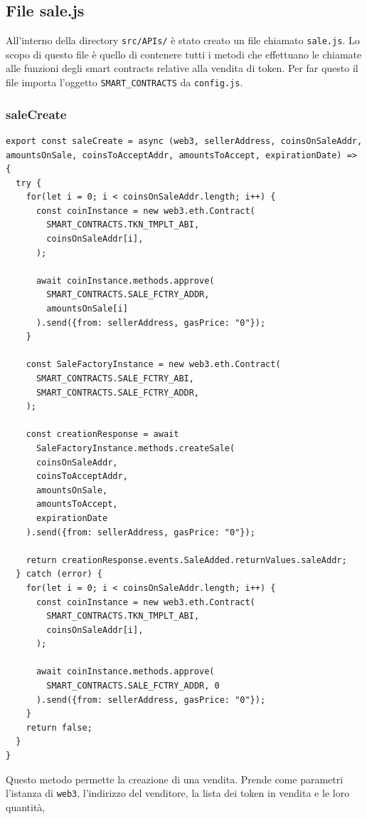 \documentclass[a4paper]{article}
\begin{document}
        \subsection{File sale.js}
        All'interno della directory \verb|src/APIs/| è stato creato un file chiamato \verb|sale.js|. Lo scopo di questo file è quello di contenere tutti i metodi che effettuano le chiamate alle funzioni degli smart contracts
        relative alla vendita di token. Per far questo il file importa l'oggetto \verb|SMART_CONTRACTS| da \verb|config.js|.
        \subsubsection{saleCreate}
        \begin{lstlisting}[style=ES6, title={Funzione saleCreate()}]
export const saleCreate = async (web3, sellerAddress, coinsOnSaleAddr, amountsOnSale, coinsToAcceptAddr, amountsToAccept, expirationDate) => {
  try {
    for(let i = 0; i < coinsOnSaleAddr.length; i++) {
      const coinInstance = new web3.eth.Contract(
        SMART_CONTRACTS.TKN_TMPLT_ABI,
        coinsOnSaleAddr[i],
      );

      await coinInstance.methods.approve(
        SMART_CONTRACTS.SALE_FCTRY_ADDR,
        amountsOnSale[i]
      ).send({from: sellerAddress, gasPrice: "0"});
    }

    const SaleFactoryInstance = new web3.eth.Contract(
      SMART_CONTRACTS.SALE_FCTRY_ABI,
      SMART_CONTRACTS.SALE_FCTRY_ADDR,
    );

    const creationResponse = await 
      SaleFactoryInstance.methods.createSale(
      coinsOnSaleAddr,
      coinsToAcceptAddr,
      amountsOnSale,
      amountsToAccept,
      expirationDate
    ).send({from: sellerAddress, gasPrice: "0"});

    return creationResponse.events.SaleAdded.returnValues.saleAddr;
  } catch (error) {
    for(let i = 0; i < coinsOnSaleAddr.length; i++) {
      const coinInstance = new web3.eth.Contract(
        SMART_CONTRACTS.TKN_TMPLT_ABI,
        coinsOnSaleAddr[i],
      );

      await coinInstance.methods.approve(
        SMART_CONTRACTS.SALE_FCTRY_ADDR, 0
      ).send({from: sellerAddress, gasPrice: "0"});
    }
    return false;
  }
}\end{lstlisting}
        Questo metodo permette la creazione di una vendita. Prende come parametri l'istanza di \verb|web3|, l'indirizzo del venditore, la lista dei token in vendita e le loro quantità,
\end{document}
